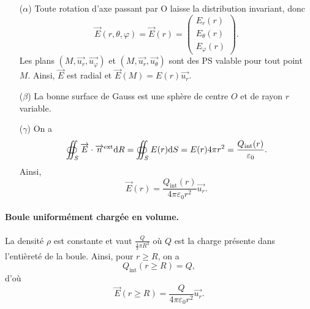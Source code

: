             \begin{itemize}
                \item [($\alpha$)] Toute rotation d'axe passant par O laisse la distribution invariant, donc 
                \begin{equation*}
                    \vec{E}(r,\theta,\varphi)=\vec{E}(r)=\begin{pmatrix}
                        E_r(r)\\ E_{\theta}(r)\\E_{\varphi}(r)
                    \end{pmatrix}.
                \end{equation*}
                Les plans $(M,\vec{u_r},\vec{u_{\varphi}})$ et $(M,\vec{u_r},\vec{u_{\theta}})$ sont des PS valable pour tout point $M$. Ainsi, $\vec{E}$ est radial et $\vec{E}(M)=E(r)\vec{u_r}$.
                \item [($\beta$)] La bonne surface de Gauss est une sphère de centre $O$ et de rayon $r$ variable.
                \item [($\gamma$)] On a 
                \begin{equation*}
                    \oiint_{S}\protect\overrightarrow{{E}}\cdot\protect\overrightarrow{{n}}^{\text{ext}}\mathrm{d} R=\oiint_{S}E(r)\mathrm{d} S=E(r)4\pi r^{2}=\frac{Q_{\text{int}}(r)}{\varepsilon_{0}}.
                \end{equation*}
                Ainsi,
                \begin{equation*}
                    \boxed{
                        \vec{E}(r)=\frac{Q_{\text{int}}(r)}{4\pi\varepsilon_{0}r^{2}}\vec{u_r}.
                    }
                \end{equation*}
            \end{itemize}

            \paragraph{Boule uniformément chargée en volume.}

                La densité $\rho$ est constante et vaut $\frac{Q}{\frac{4}{3}\pi R^{3}}$ où $Q$ est la charge présente dans l'entièreté de la boule. Ainsi, pour $r\geqslant R$, on a 
                \begin{equation*}
                    Q_{\text{int}}(r\geqslant R)=Q,
                \end{equation*}
                d'où
                \begin{equation*}
                    \boxed{
                        \vec{E}(r\geqslant R)=\frac{Q}{4\pi\varepsilon_0 r^{2}}\vec{u_r}.
                    }
                \end{equation*}


